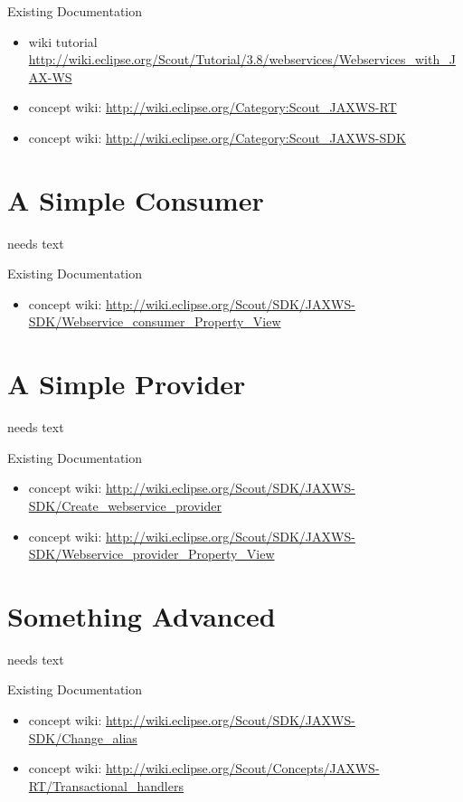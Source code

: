 \documentclass[a4paper,10pt,twoside]{book}
\begin{document}
\noindent Existing Documentation
\begin{itemize}
  \item wiki tutorial \url{http://wiki.eclipse.org/Scout/Tutorial/3.8/webservices/Webservices_with_JAX-WS}
  \item concept wiki: \url{http://wiki.eclipse.org/Category:Scout_JAXWS-RT}
  \item concept wiki: \url{http://wiki.eclipse.org/Category:Scout_JAXWS-SDK}
\end{itemize}

\section{A Simple Consumer}
needs text

\noindent Existing Documentation
\begin{itemize}
  \item concept wiki: \url{http://wiki.eclipse.org/Scout/SDK/JAXWS-SDK/Webservice_consumer_Property_View}
\end{itemize}

\section{A Simple Provider}
needs text

\noindent Existing Documentation
\begin{itemize}
  \item concept wiki: \url{http://wiki.eclipse.org/Scout/SDK/JAXWS-SDK/Create_webservice_provider}
  \item concept wiki: \url{http://wiki.eclipse.org/Scout/SDK/JAXWS-SDK/Webservice_provider_Property_View}
\end{itemize}

\section{Something Advanced}
needs text

\noindent Existing Documentation
\begin{itemize}
  \item concept wiki: \url{http://wiki.eclipse.org/Scout/SDK/JAXWS-SDK/Change_alias}
  \item concept wiki: \url{http://wiki.eclipse.org/Scout/Concepts/JAXWS-RT/Transactional_handlers}
\end{itemize}
\end{document}
